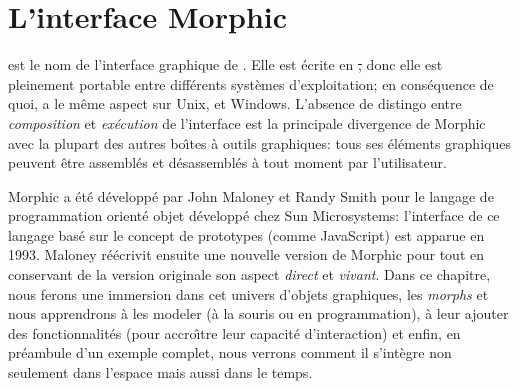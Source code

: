 \documentclass[a4paper,10pt,twoside]{book}
\begin{document}
	\renewcommand{\nnbb}[2]{} %
	\sloppy
\fi
\chapter{L'interface Morphic}


%
 est le nom de l'interface graphique de \sq.
Elle est \'ecrite en \st, donc elle est pleinement portable entre
diff\'erents syst\`emes d'exploitation; en cons\'equence de quoi, \sq
a le m\^eme aspect sur Unix, \macosx et Windows.
L'absence de distingo entre \emph{composition} et \emph{ex\'ecution}
de l'interface est la principale divergence de Morphic avec la plupart
des autres bo\^{\i}tes \`a outils graphiques: tous ses \'el\'ements
graphiques peuvent \^etre assembl\'es et d\'esassembl\'es \`a tout
moment par l'utilisateur.



Morphic a \'et\'e d\'evelopp\'e par John Maloney et Randy Smith pour
le langage de programmation orient\'e objet  d\'evelopp\'e
chez Sun Microsystems:
l'interface de ce langage bas\'e sur le concept de prototypes (comme
JavaScript) est apparue en 1993.
Maloney r\'e\'ecrivit ensuite une nouvelle version de Morphic pour
\sq tout en conservant de la version originale son aspect 
\emph{direct} et 
\emph{vivant}.
Dans ce chapitre, nous ferons une immersion dans cet univers d'objets
graphiques, les \emph{morphs} et nous apprendrons \`a les modeler (\`a la
souris ou en programmation), \`a leur ajouter des fonctionnalit\'es (pour
accro\^{\i}tre leur capacit\'e d'interaction) et enfin, en pr\'eambule
d'un exemple complet, nous verrons comment il s'int\`egre non seulement
dans l'espace mais aussi dans le temps.
\end{document}
